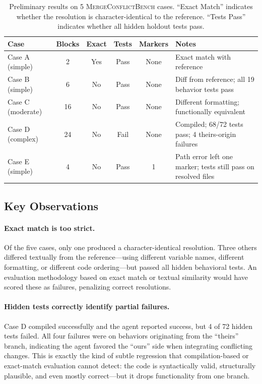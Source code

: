 \documentclass[11pt,a4paper]{article}
\begin{document}
\begin{table}[ht]
\centering
\caption{Preliminary results on 5 \textsc{MergeConflictBench} cases. ``Exact Match'' indicates whether the resolution is character-identical to the reference. ``Tests Pass'' indicates whether all hidden holdout tests pass.}
\label{tab:preliminary}
\small
\begin{tabularx}{\textwidth}{lccccX}
\toprule
\textbf{Case} & \textbf{Blocks} & \textbf{Exact} & \textbf{Tests} & \textbf{Markers} & \textbf{Notes} \\
\midrule
Case A (simple)    & 2  & Yes & Pass & None & Exact match with reference \\
Case B (simple)    & 6  & No  & Pass & None & Diff from reference; all 19 behavior tests pass \\
Case C (moderate)  & 16 & No  & Pass & None & Different formatting; functionally equivalent \\
Case D (complex)   & 24 & No  & Fail & None & Compiled; 68/72 tests pass; 4 theirs-origin failures \\
Case E (simple)    & 4  & No  & Pass & 1    & Path error left one marker; tests still pass on resolved files \\
\bottomrule
\end{tabularx}
\end{table}

\subsection{Key Observations}

\paragraph{Exact match is too strict.} Of the five cases, only one produced a character-identical resolution. Three others differed textually from the reference---using different variable names, different formatting, or different code ordering---but passed all hidden behavioral tests. An evaluation methodology based on exact match or textual similarity would have scored these as failures, penalizing correct resolutions.

\paragraph{Hidden tests correctly identify partial failures.} Case D compiled successfully and the agent reported success, but 4 of 72 hidden tests failed. All four failures were on behaviors originating from the ``theirs'' branch, indicating the agent favored the ``ours'' side when integrating conflicting changes. This is exactly the kind of subtle regression that compilation-based or exact-match evaluation cannot detect: the code is syntactically valid, structurally plausible, and even mostly correct---but it drops functionality from one branch.
\end{document}

